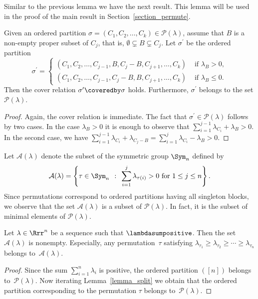 Similar to the previous lemma we have the next result.
This lemma will be used in the proof of the main result
in Section~\ref{section_permute}.

\begin{lemma}
Given an ordered partition
$\sigma = (C_{1}, C_{2}, \ldots, C_{k}) \in \mathcal{P}(\lambda)$,
assume that $B$ is a non-empty proper subset of $C_{j}$,
that is,
$\emptyset \subsetneq B \subsetneq C_{j}$.
Let $\sigma^{\prime}$ be the ordered partition
$$
\sigma^{\prime}
=
\begin{cases}
(C_{1}, C_{2}, \ldots, C_{j-1}, B, C_{j} - B, C_{j+1}, \ldots, C_{k}) 
& \text{ if } \lambda_{B} > 0 , \\
(C_{1}, C_{2}, \ldots, C_{j-1}, C_{j} - B, B, C_{j+1}, \ldots, C_{k}) 
& \text{ if } \lambda_{B} \leq 0 . 
\end{cases}
$$
Then the cover relation $\sigma^{\prime} \coveredby \sigma$ holds.
Furthermore, $\sigma^{\prime}$ belongs to the set $\mathcal{P}(\lambda)$.
\label{lemma_split_block}
\end{lemma}
\begin{proof}
Again, the cover relation is immediate.
The fact that $\sigma^{\prime} \in \mathcal{P}(\lambda)$
follows by two cases.
In the case $\lambda_{B} > 0$
it is enough to observe that
$\sum_{i=1}^{j-1} \lambda_{C_{i}} + \lambda_{B} > 0$.
In the second case, we have
$\sum_{i=1}^{j-1} \lambda_{C_{i}} + \lambda_{C_{j} - B}
=
\sum_{i=1}^{j} \lambda_{C_{i}} - \lambda_{B}
 > 0$.
\end{proof}



Let $\mathcal{A}(\lambda)$ denote the subset
of the symmetric group $\Sym_{n}$
defined by
$$
\mathcal{A}(\lambda)
=
\left\{ \tau \in \Sym_{n} \:\: : \:\:
\sum_{i=1}^{j} \lambda_{\tau(i)} > 0 \text{ for } 1 \leq j\leq n \right\} .
$$
Since permutations correspond to ordered partitions
having all singleton blocks,
we observe that the set
$\mathcal{A}(\lambda)$ is a subset of
$\mathcal{P}(\lambda)$. In fact, it is the subset of minimal
elements of $\mathcal{P}(\lambda)$.


\begin{lemma}
Let $\lambda \in \Rrr^{n}$ be a sequence
such that $\lambdasumpositive$.
Then the set~$\mathcal{A}(\lambda)$ is nonempty.
Especially, any permutation~$\tau$
satisfying
$\lambda_{\tau_{1}} \geq \lambda_{\tau_{2}} \geq \cdots \geq \lambda_{\tau_{n}}$ 
belongs to~$\mathcal{A}(\lambda)$.
\end{lemma}
\begin{proof}
Since the sum $\sum_{i=1}^{n} \lambda_{i}$ is positive,
the ordered partition $([n])$ belongs 
to~$\mathcal{P}(\lambda)$.
Now iterating Lemma~\ref{lemma_split}
we obtain that the ordered partition corresponding to
the permutation $\tau$ 
belongs to~$\mathcal{P}(\lambda)$.
\end{proof}



